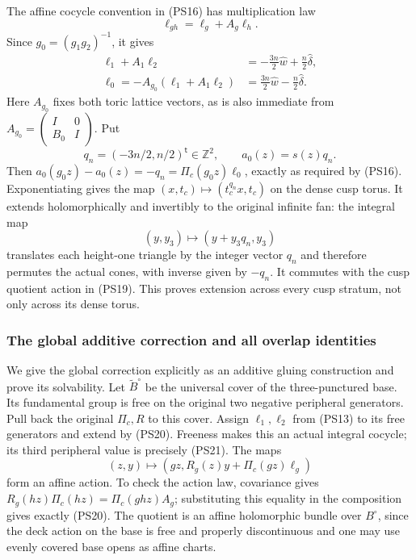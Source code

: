 The affine cocycle convention in (PS16) has multiplication law
\[
                    \ell_{gh}=\ell_g+A_g\ell_h.
 \tag{PS20}\label{pshift:eq:cocycle-law}
\]
Since $g_0=(g_1g_2)^{-1}$, it gives
\[
\begin{aligned}
 \ell_1+A_1\ell_2
   &=-\frac{3n}{2}\widehat w+\frac n2\widehat\delta,\\
 \ell_0=-A_{g_0}(\ell_1+A_1\ell_2)
   &=\frac{3n}{2}\widehat w-\frac n2\widehat\delta.
\end{aligned}
\tag{PS21}\label{pshift:eq:cusp-cocycle}
\]
Here $A_{g_0}$ fixes both toric lattice vectors, as is also immediate
from $A_{g_0}=\left(\begin{smallmatrix}I&0\\B_0&I\end{smallmatrix}\right)$.
Put
\[
 q_n=(-3n/2,n/2)^{\mathsf t}\in\mathbb Z^2,
                  \qquad a_0(z)=s(z)q_n.
 \tag{PS22}\label{pshift:eq:cusp-translation}
\]
Then $a_0(g_0z)-a_0(z)=-q_n=\Pi_c(g_0z)\ell_0$, exactly as
required by (PS16). Exponentiating gives the map
$(x,t_c)\mapsto(t_c^{q_n}x,t_c)$ on the dense cusp torus.
It extends holomorphically and invertibly to the original infinite fan:
the integral map
\[
 (y,y_3)\longmapsto(y+y_3q_n,y_3)
\]
translates each height-one triangle by the integer vector $q_n$ and
therefore permutes the actual cones, with inverse given by $-q_n$.
It commutes with the cusp quotient action in (PS19). This proves
extension across every cusp stratum, not only across its dense torus.

\subsubsection{The global additive correction and all overlap identities}

We give the global correction explicitly as an additive gluing
construction and prove its solvability. Let $\widetilde B^\circ$ be
the universal cover of the three-punctured base. Its fundamental group
is free on the original two negative peripheral generators. Pull back
the original $\Pi_c,R$ to this cover. Assign $\ell_1,\ell_2$ from
(PS13) to its free generators and extend by (PS20). Freeness makes
this an actual integral cocycle; its third peripheral value is
precisely (PS21). The maps
\[
 (z,y)\longmapsto
       (gz,R_g(z)y+\Pi_c(gz)\ell_g)
 \tag{PS23}\label{pshift:eq:affine-bundle-action}
\]
form an affine action. To check the action law, covariance gives
$R_g(hz)\Pi_c(hz)=\Pi_c(ghz)A_g$; substituting this equality
in the composition gives exactly (PS20).
The quotient is an affine holomorphic bundle over $B^\circ$, since
the deck action on the base is free and properly discontinuous and
one may use evenly covered base opens as affine charts.

